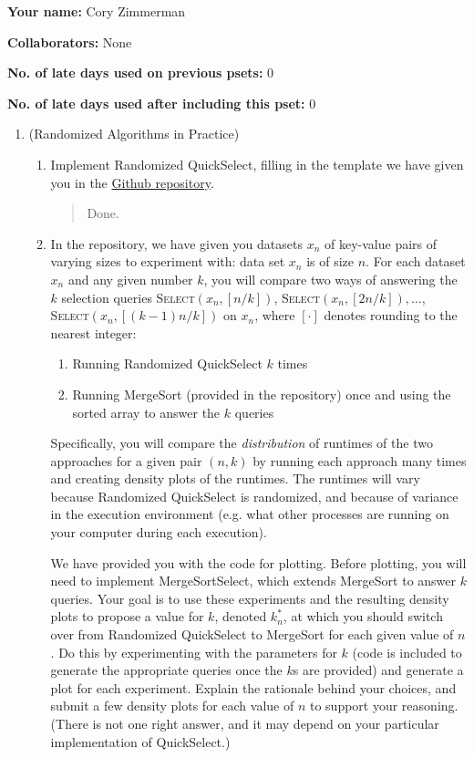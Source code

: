\documentclass[11pt]{article}
\begin{document}


\textbf{Your name:} Cory Zimmerman

\textbf{Collaborators:} None

\textbf{No. of late days used on previous psets:} 0

\textbf{No. of late days used after including this pset:} 0

\begin{enumerate}
    \item (Randomized Algorithms in Practice)  
    \begin{enumerate}
        \item Implement Randomized QuickSelect, filling in the template we have given you in the \href{https://github.com/Harvard-CS-120/cs120/tree/main/fall2023/psets}{Github repository}.  
        \begin{quote}
            \color{purple}
            Done.
        \end{quote}

        \item 
        In the repository, we have given you datasets $x_n$ of
        key-value pairs of varying sizes to experiment with: data set $x_n$ is of size $n$.  For each dataset $x_n$ and any given number $k$, you will compare two ways of answering the $k$ selection queries
        \textsc{Select}$(x_n,[n/k])$, \textsc{Select}$(x_n,[2n/k]), \ldots$, \textsc{Select}$(x_n,[(k-1)n/k])$ on $x_n$, where $[\cdot]$ denotes rounding to the nearest integer:
        \begin{enumerate}
            \item Running Randomized QuickSelect $k$ times
            \item Running MergeSort (provided in the repository) once and using the sorted array to answer the $k$ queries
        \end{enumerate}
        Specifically, you will compare the {\em distribution} of runtimes of the two approaches for a given pair $(n,k)$ by running each approach many times and creating density plots of the runtimes.  The runtimes will vary because Randomized QuickSelect  is randomized, and because of variance in the execution environment (e.g. what other processes are running on your computer during each execution). \vspace{1.5mm}
        
        We have provided you with the code for plotting. Before plotting, you will need to implement MergeSortSelect, which extends MergeSort to answer $k$ queries. Your goal is to use these experiments and the resulting density plots to propose a value for $k$, denoted $k^*_n$, at which you should switch over from Randomized QuickSelect to MergeSort for each given value of $n$. Do this by experimenting with the parameters for $k$ (code is included to generate the appropriate queries once the $k$s are provided) and generate a plot for each experiment.  Explain the rationale behind your choices, and submit a few density plots for each value of $n$ to support your reasoning.  (There is not one right answer, and it may depend on your particular implementation of QuickSelect.) 


\end{enumerate}
\end{enumerate}
\end{document}
